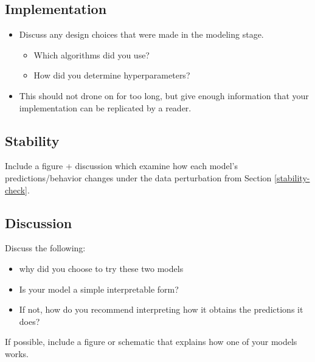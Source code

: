 \documentclass[10pt,letterpaper]{article}
\begin{document}
\subsection{Implementation}

\begin{itemize}
    \item Discuss any design choices that were made in the modeling stage.
    \begin{itemize}
        \item Which algorithms did you use?
        \item How did you determine hyperparameters? 
    \end{itemize}
    \item This should not drone on for too long, but give enough information that your implementation can be replicated by a reader.
\end{itemize}

\subsection{Stability}

Include a figure + discussion which examine how each model's predictions/behavior changes under the data perturbation from Section \ref{stability-check}.

\subsection{Discussion}

Discuss the following:
\begin{itemize}
    \item why did you choose to try these two models
    \item Is your model a simple interpretable form?
    \item If not, how do you recommend interpreting how it
obtains the predictions it does?
\end{itemize}
If possible, include a figure or schematic that explains how one of your models works.
\end{document}
